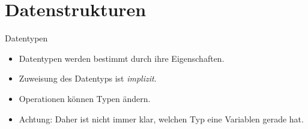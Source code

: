 \documentclass[hyperref={xetex}]{beamer}
\begin{document}
\section{Datenstrukturen}
%
%
%
\begin{frame}[fragile]{Datentypen}
\begin{itemize}
\item \alert{Datentypen} werden bestimmt durch ihre Eigenschaften.
\item Zuweisung des Datentyps ist {\it implizit}. 
\item Operationen können Typen ändern.
\item Achtung: Daher ist nicht immer klar, welchen Typ eine Variablen gerade hat.
\end{itemize}
\end{frame}
%
%
%
%
%
%
\end{document}
